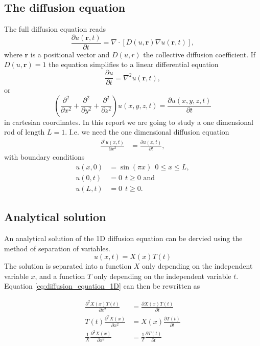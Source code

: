 \documentclass[12pt]{extarticle}
\begin{document}
\subsection{The diffusion equation}

The full diffusion equation reads
\begin{equation}
\frac{\partial u(\mathbf{r}, t)}{\partial t} = \nabla \cdot \left[D(u, \mathbf{r})\nabla u(\mathbf{r}, t)\right],
\end{equation}
where $\mathbf{r}$ is a positional vector and $D(u,r)$ the collective diffusion coefficient. If $D(u,\mathbf{r}) = 1$ the equation simplifies to a linear differential equation
\begin{equation}
\frac{\partial u}{\partial t} = \nabla^2u(\mathbf{r}, t),
\end{equation}
or
\begin{equation}
\label{eq:diffusion_equation}
\left(\frac{\partial^2}{\partial x^2} + \frac{\partial^2}{\partial y^2} + \frac{\partial^2}{\partial z^2}\right) u(x,y,z,t) = \frac{\partial u(x,y,z,t)}{\partial t}
\end{equation}
in cartesian coordinates. In this report we are going to study a one dimensional rod of length $L=1$. I.e. we need the one dimensional diffusion equation
\begin{align}
\label{eq:diffusion_equation_1D}
\frac{\partial^2 u(x,t)}{\partial x^2} &= \frac{\partial u(x,t)}{\partial t},
\end{align}
with boundary conditions
\begin{align}
u(x,0) &= \sin(\pi x) \ \ 0\leq x\leq L,\\
u(0,t) &= 0 \ \ t\geq 0 \text{ and} \\
u(L,t) &= 0 \ \ t\geq 0.
\end{align}

\subsection{Analytical solution}
An analytical solution of the 1D diffusion equation can be dervied using the method of separation of variables.
\[ u(x,t) = X(x)T(t) \]
The solution is separated into a function $X$ only depending on the independent variable $x$, and a function $T$ only depending on the independent variable $t$. Equation \eqref{eq:diffusion_equation_1D} can then be rewritten as

\begin{align*}
	\frac{\partial^2 X(x)T(t)}{\partial x^2} &= \frac{\partial X(x)T(t)}{\partial t} \\
	T(t)\frac{\partial^2 X(x)}{\partial x^2} &= X(x)\frac{\partial T(t)}{\partial t} \\
	\frac{1}{X}\frac{\partial^2 X(x)}{\partial x^2} &= \frac{1}{T}\frac{\partial T(t)}{\partial t}
\end{align*}
\end{document}
